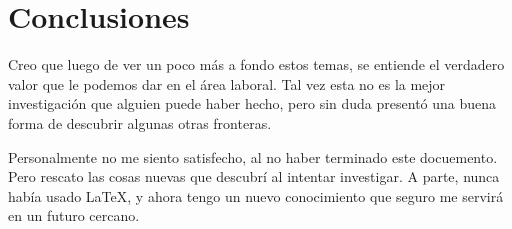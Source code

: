 \chapter{Conclusiones}

Creo que luego de ver un poco más a fondo estos temas, se entiende el verdadero valor que le podemos dar en el área laboral. Tal vez esta no es la mejor investigación que alguien puede haber hecho, pero sin duda presentó una buena forma de descubrir algunas otras fronteras.

Personalmente no me siento satisfecho, al no haber terminado este docuemento. Pero rescato las cosas nuevas que descubrí al intentar investigar. A parte, nunca había usado \LaTeX, y ahora tengo un nuevo conocimiento que seguro me servirá en un futuro cercano.